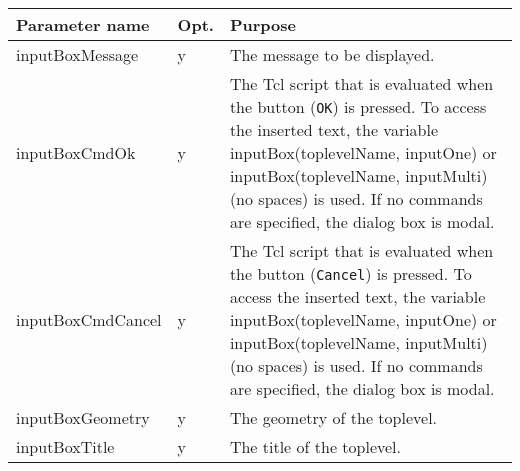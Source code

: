 {\newpage
\clearpage
\samepage \begin{figure}[ht]
  \centerline{
  \epsfysize=10.5cm
  }

  \label{fig:IconBarConf}
\end{figure}
}

{\newpage
\clearpage
\samepage \begin{tabular}{|l|l|p{6.3cm}|} \hline
Parameter name    & Opt. & Purpose\\  \hline
inputBoxMessage   & y    & The message to be displayed.\\  \hline
inputBoxCmdOk     & y    & The Tcl script that is
                           evaluated when the button
                           ({\tt OK\tt}) is pressed.
                           To access the inserted text,
                           the variable
                           input\-Box(top\-level\-Name,
                           input\-One) or
                           input\-Box(top\-level\-Name,
                           input\-Multi) (no spaces)
                           is used. If no commands are
                           specified, the dialog box is
                           modal.\\  \hline
inputBoxCmdCancel & y    & The Tcl script that is
                           evaluated when the button
                           ({\tt Cancel\tt}) is
                           pressed. To access the
                           inserted text, the variable
                           input\-Box(top\-level\-Name,
                           input\-One) or
                           input\-Box(top\-level\-Name,
                           input\-Multi) (no spaces) is
                           used. If no commands are
                           specified, the dialog box is
                           modal.\\  \hline
inputBoxGeometry  & y    & The geometry of the toplevel.\\  \hline
inputBoxTitle     & y    & The title of the toplevel.\\  \hline
\end{tabular}
}

